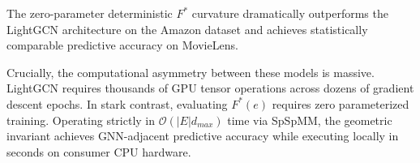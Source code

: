 \documentclass{siuro250211}
\begin{document}
\begin{table}[h]
\centering
\caption{Link Prediction AUC-ROC and Complexity Comparison}
\label{tab:auc}
\end{table}

The zero-parameter deterministic $F^*$ curvature dramatically outperforms the LightGCN architecture on the Amazon dataset and achieves statistically comparable predictive accuracy on MovieLens.

Crucially, the computational asymmetry between these models is massive. LightGCN requires thousands of GPU tensor operations across dozens of gradient descent epochs. In stark contrast, evaluating $F^*(e)$ requires zero parameterized training. Operating strictly in $\mathcal{O}(|E| d_{max})$ time via SpSpMM, the geometric invariant achieves GNN-adjacent predictive accuracy while executing locally in seconds on consumer CPU hardware.
\end{document}
